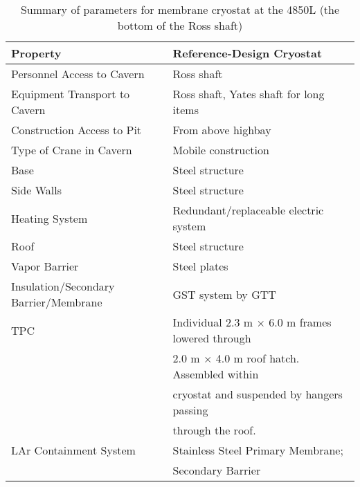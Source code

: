 
\begin{table}
\caption[Summary of parameters for membrane cryostat at the 4850L]{Summary of parameters for membrane cryostat at the 4850L (the bottom of the Ross shaft)} 
\label{table:cryo-reqs}
\begin{tabular}[htbp]{| p{}|p{}|}
\hline 
\textbf{Property} & \textbf{Reference-Design Cryostat}\\
\hline\hline
Personnel Access to Cavern & Ross shaft\\
\hline
Equipment Transport to Cavern & Ross shaft, Yates shaft for long items \\
\hline
Construction Access to Pit & From above highbay \\
\hline
Type of Crane in Cavern & Mobile construction \\
\hline
Base & Steel structure \\
\hline
Side Walls & Steel structure \\
\hline
Heating System & Redundant/replaceable electric system \\
\hline
Roof & Steel structure \\
\hline
Vapor Barrier & Steel plates  \\
\hline
Insulation/Secondary Barrier/Membrane & GST system by GTT \\
\hline
TPC & Individual 2.3 m $\times$ 6.0 m frames lowered through \\
    & 2.0 m $\times$ 4.0 m roof hatch. Assembled within \\
    & cryostat and suspended by hangers passing \\
    & through the roof. \\
\hline
LAr Containment System & Stainless Steel Primary Membrane; \\
                       & Secondary Barrier \\
            
\hline
\end{tabular} 
\end{table}






